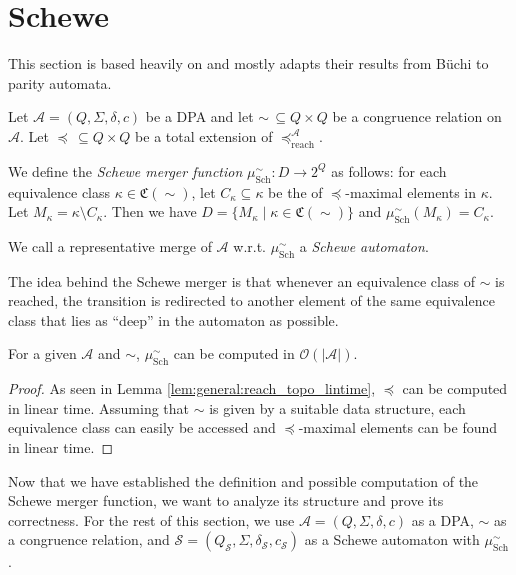 
\section{Schewe}
This section is based heavily on \cite{Schewe2010} and mostly adapts their results from B\"uchi to parity automata.

\begin{defn}
	Let $\mathcal{A} = (Q, \Sigma, \delta, c)$ be a DPA and let $\sim \,\subseteq Q \times Q$ be a congruence relation on $\mathcal{A}$. Let $\preceq \,\subseteq Q \times Q$ be a total extension of $\preceq_\text{reach}^\mathcal{A}$. 
	
	We define the \emph{Schewe merger function} $\mu_\text{Sch}^\sim : D \rightarrow 2^Q$ as follows: for each equivalence class $\kappa \in \mathfrak{C}(\sim)$, let $C_\kappa \subseteq \kappa$ be the of $\preceq$-maximal elements in $\kappa$. Let $M_\kappa = \kappa \setminus C_\kappa$. Then we have $D = \{ M_\kappa \mid \kappa \in \mathfrak{C}(\sim) \}$ and $\mu_\text{Sch}^\sim(M_\kappa) = C_\kappa$.
	
	We call a representative merge of $\mathcal{A}$ w.r.t. $\mu_\text{Sch}^\sim$ a \emph{Schewe automaton}.
\end{defn}

The idea behind the Schewe merger is that whenever an equivalence class of $\sim$ is reached, the transition is redirected to another element of the same equivalence class that lies as \enquote{deep} in the automaton as possible.

\begin{lem}
\label{lem:schewe:schewe_aut_linear_time}
	For a given $\mathcal{A}$ and $\sim$, $\mu_\text{Sch}^\sim$ can be computed in $\mathcal{O}(|\mathcal{A}|)$.
\end{lem}

\begin{proof}
	As seen in Lemma \ref{lem:general:reach_topo_lintime}, $\preceq$ can be computed in linear time. Assuming that $\sim$ is given by a suitable data structure, each equivalence class can easily be accessed and $\preceq$-maximal elements can be found in linear time.
\end{proof}

\vspace{10pt}

Now that we have established the definition and possible computation of the Schewe merger function, we want to analyze its structure and prove its correctness. For the rest of this section, we use $\mathcal{A} = (Q, \Sigma, \delta, c)$ as a DPA, $\sim$ as a congruence relation, and $\mathcal{S} = (Q_\mathcal{S}, \Sigma, \delta_\mathcal{S}, c_\mathcal{S})$ as a Schewe automaton with $\mu_\text{Sch}^\sim$.

